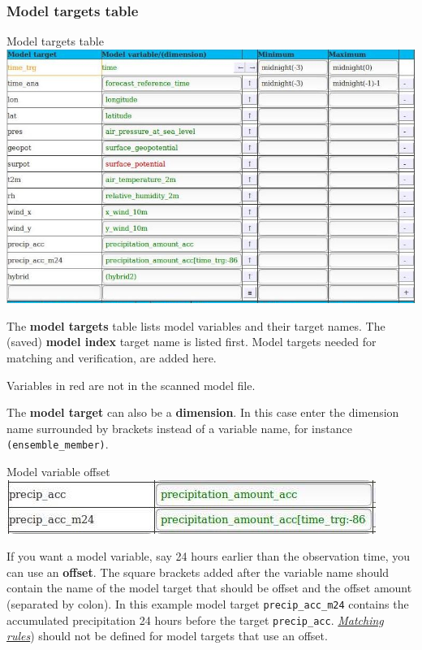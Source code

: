 \documentclass[letterpaper,10pt,twoside,twocolumn,openany]{book}
\begin{document}
\subsubsection{Model targets table}
\begin{paperbox}{Model targets table}
  \includegraphics[width=\columnwidth]{coloc_model.jpg}
\end{paperbox}
The {\bf model targets} table lists model variables and their target names.
The (saved) {\bf model index} target name is listed first.
Model targets needed for matching and verification, are added here.
\begin{quotebox}
  Variables in red are not in the scanned model file.
\end{quotebox}
The {\bf model target} can also be a {\bf dimension}. 
In this case enter the dimension name surrounded by brackets instead of a variable name,
for instance \lstinline!(ensemble_member)!.
\begin{paperbox}{Model variable offset}
  \includegraphics[width=\columnwidth]{offset.jpg}
\end{paperbox}
If you want a model variable, say 24 hours earlier than the observation time, you can use an {\bf offset}.
The square brackets added after the variable name should contain the 
name of the model target that should be offset and the offset amount (separated by colon).
In this example model target \lstinline!precip_acc_m24! contains the accumulated precipitation 24 
hours before the target \lstinline!precip_acc!.
\hyperlink{matching}{\em Matching rules}) should not be defined for model targets that use an offset.
\end{document}
